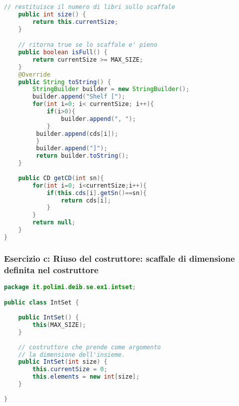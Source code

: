\documentclass{article}
\begin{document}
\begin{lstlisting}[language=Java,escapechar=|]
	// restituisce il numero di libri sullo scaffale
	public int size() {
		return this.currentSize;
	}

	// ritorna true se lo scaffale e' pieno
	public boolean isFull() {
		return currentSize >= MAX_SIZE;
	}
	@Override
	public String toString() {
		StringBuilder builder = new StringBuilder();
        builder.append("Shelf [");
        for(int i=0; i< currentSize; i++){
            if(i>0){
                builder.append(", ");
            }
         builder.append(cds[i]);
         }
         builder.append("]");
         return builder.toString();
	}
	
	public CD getCD(int sn){
		for(int i=0; i<currentSize;i++){
			if(this.cds[i].getSn()==sn){
				return cds[i];
			}
		}
		return null;
	}
}
\end{lstlisting}

\subsubsection{Esercizio c: Riuso del costruttore: scaffale di dimensione definita nel costruttore}


\begin{lstlisting}[language=Java,escapechar=|]
package it.polimi.deib.se.ex1.intset;

public class IntSet {
	
	public IntSet() {
		this(MAX_SIZE);
	}
	
	// costruttore che prende come argomento
	// la dimensione dell'insieme.
	public IntSet(int size) {
		this.currentSize = 0;
		this.elements = new int[size];
	}
	
}
\end{lstlisting}
\end{document}
